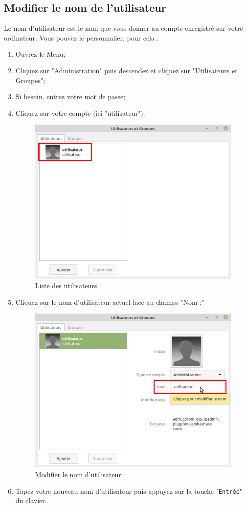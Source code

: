 \documentclass[12pt]{book}
\begin{document}
	\subsection{Modifier le nom de l'utilisateur}
		Le nom d'utilisateur est le nom que vous donner au compte enregistré sur votre ordinateur.
		Vous pouvez le personnalier, pour cela :
		\begin{enumerate}
			\item Ouvrez le Menu;
			\item Cliquez sur "Administration" puis descendez et cliquez sur "Utilisateurs et Groupes";
			\item Si besoin, entrez votre mot de passe;
			\item Cliquez sur votre compte (ici "utilisateur");
			\begin{figure}[h]
				\centering
				\includegraphics[width=\textwidth]{include/users.png}
				\caption{Liste des utilisateurs}
				\label{fig:nomuser}
			\end{figure}
			\item Cliquez sur le nom d'utilisateur actuel face au champs "Nom :"
			\begin{figure}[h]
				\centering
				\includegraphics[width=.8\textwidth]{include/nomuser.png}
				\caption{Modifier le nom d'utilisateur}
				\label{fig:nomuser}
			\end{figure}
			\item Tapez votre nouveau nom d'utilisateur puis appuyez sur la touche "\texttt{Entrée}" du clavier.
		\end{enumerate}
\end{document}
